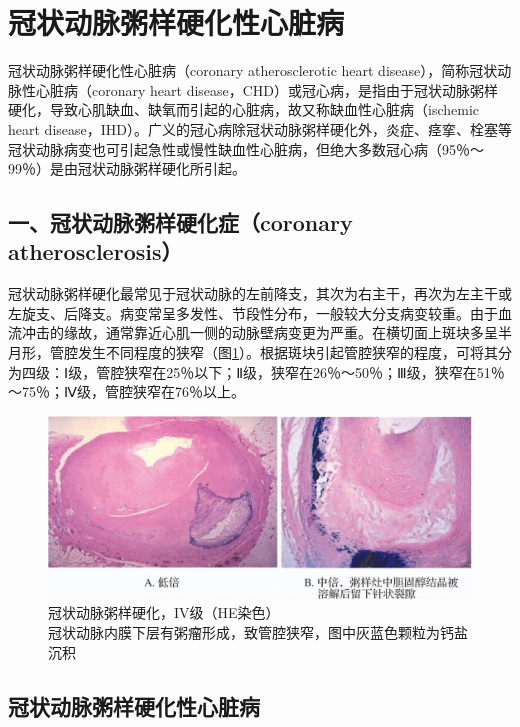 \section{冠状动脉粥样硬化性心脏病}

冠状动脉粥样硬化性心脏病（coronary atherosclerotic heart
disease），简称冠状动脉性心脏病（coronary heart
disease，CHD）或冠心病，是指由于冠状动脉粥样硬化，导致心肌缺血、缺氧而引起的心脏病，故又称缺血性心脏病（ischemic
heart
disease，IHD）。广义的冠心病除冠状动脉粥样硬化外，炎症、痉挛、栓塞等冠状动脉病变也可引起急性或慢性缺血性心脏病，但绝大多数冠心病（95％～99％）是由冠状动脉粥样硬化所引起。

\subsection{一、冠状动脉粥样硬化症（coronary
    atherosclerosis）}

冠状动脉粥样硬化最常见于冠状动脉的左前降支，其次为右主干，再次为左主干或左旋支、后降支。病变常呈多发性、节段性分布，一般较大分支病变较重。由于血流冲击的缘故，通常靠近心肌一侧的动脉壁病变更为严重。在横切面上斑块多呈半月形，管腔发生不同程度的狭窄（图\ref{fig6-3}）。根据斑块引起管腔狭窄的程度，可将其分为四级：Ⅰ级，管腔狭窄在25％以下；Ⅱ级，狭窄在26％～50％；Ⅲ级，狭窄在51％～75％；Ⅳ级，管腔狭窄在76％以上。

\begin{figure}[!htbp]
    \centering
    \includegraphics{./images/Image00095.jpg}
    \captionsetup{justification=centering}
    \caption{冠状动脉粥样硬化，IV级（HE染色）\\{\small 冠状动脉内膜下层有粥瘤形成，致管腔狭窄，图中灰蓝色颗粒为钙盐沉积}}
    \label{fig6-3}
\end{figure}



\subsection{冠状动脉粥样硬化性心脏病}

